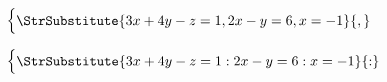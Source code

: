 \documentclass{article}
\newcommand\simpleSysteme[2][,]{%
		\begingroup\noexpandarg
			\ensuremath{%
				\begin{cases}
					\StrSubstitute{#2}{#1}\\
				\end{cases}%
			}%
		\endgroup%
	}
\begin{document}
\simpleSysteme{
	3x+4y-z=1,
	2x-y=6,
	x=-1
}

\simpleSysteme[:]{
	3x+4y-z=1 :
	2x-y=6 :
	x=-1
}
\end{document}
